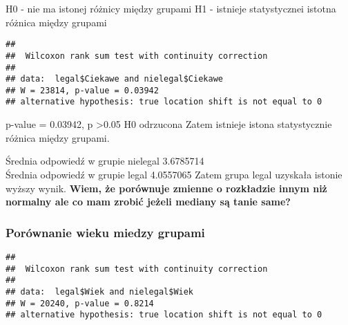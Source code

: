\documentclass[]{article}
\newenvironment{Shaded}{\begin{snugshade}}{\end{snugshade}}
\newcommand{\KeywordTok}[1]{\textcolor[rgb]{0.13,0.29,0.53}{\textbf{#1}}}
\newcommand{\OperatorTok}[1]{\textcolor[rgb]{0.81,0.36,0.00}{\textbf{#1}}}
\newcommand{\NormalTok}[1]{#1}
\begin{document}
H0 - nie ma istonej różnicy między grupami H1 - istnieje statystycznei
istotna różnica między grupami

\begin{Shaded}
\end{Shaded}

\begin{verbatim}
## 
##  Wilcoxon rank sum test with continuity correction
## 
## data:  legal$Ciekawe and nielegal$Ciekawe
## W = 23814, p-value = 0.03942
## alternative hypothesis: true location shift is not equal to 0
\end{verbatim}

p-value = 0.03942, p \textgreater{}0.05 H0 odrzucona Zatem istnieje
istona statystycznie różnica między grupami.

Średnia odpowiedź w grupie nielegal 3.6785714\\
Średnia odpowiedź w grupie legal 4.0557065 Zatem grupa legal uzyskała
istonie wyższy wynik. \textbf{Wiem, że porównuje zmienne o rozkładzie
innym niż normalny ale co mam zrobić jeżeli mediany są tanie same?}

\subsubsection{Porównanie wieku miedzy
grupami}\label{porownanie-wieku-miedzy-grupami}

\begin{Shaded}
\end{Shaded}

\begin{verbatim}
## 
##  Wilcoxon rank sum test with continuity correction
## 
## data:  legal$Wiek and nielegal$Wiek
## W = 20240, p-value = 0.8214
## alternative hypothesis: true location shift is not equal to 0
\end{verbatim}

\begin{Shaded}
\end{Shaded}
\end{document}
